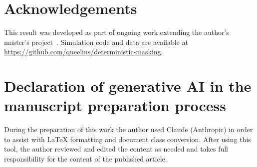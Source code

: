 \documentclass[preprint,12pt]{elsarticle}
\theoremstyle{definition}
\theoremstyle{remark}
\begin{document}
\section*{Acknowledgements}
This result was developed as part of ongoing work extending the author's
master's project~\cite{towell2023reliability}. Simulation code and data are
available at \url{https://github.com/queelius/deterministic-masking}.

\section*{Declaration of generative AI in the manuscript preparation process}
During the preparation of this work the author used Claude (Anthropic) in order
to assist with \LaTeX{} formatting and document class conversion. After using
this tool, the author reviewed and edited the content as needed and takes full
responsibility for the content of the published article.



\end{document}
